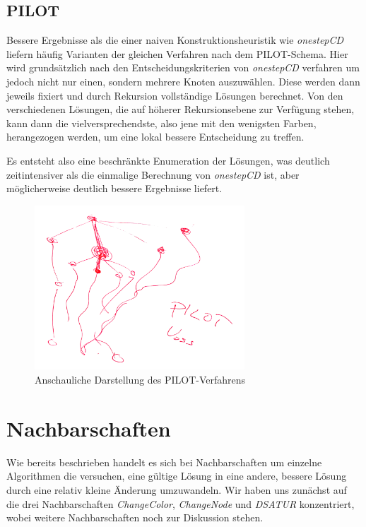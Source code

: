 \subsection{PILOT}

Bessere Ergebnisse als die einer naiven Konstruktionsheuristik wie \textit{onestepCD} liefern häufig Varianten der gleichen Verfahren nach dem PILOT-Schema. Hier  wird grundsätzlich nach den Entscheidungskriterien von \textit{onestepCD} verfahren um jedoch nicht nur einen, sondern mehrere Knoten auszuwählen. Diese werden dann jeweils fixiert und durch Rekursion vollständige Lösungen berechnet. Von den verschiedenen Lösungen, die auf höherer Rekursionsebene zur Verfügung stehen, kann dann die vielversprechendste, also jene mit den wenigsten Farben, herangezogen werden, um eine lokal bessere Entscheidung zu treffen.

Es entsteht also eine beschränkte Enumeration der Lösungen, was deutlich zeitintensiver als die einmalige Berechnung von \textit{onestepCD} ist, aber möglicherweise deutlich bessere Ergebnisse liefert.

\begin{figure}
	\centering
	\includegraphics[width=0.7\textwidth]{../img/pilot}
	\caption{Anschauliche Darstellung des PILOT-Verfahrens}
	\label{fig:pilot}
\end{figure}

\section{Nachbarschaften}
\label{sec:neigh}
Wie bereits beschrieben handelt es sich bei Nachbarschaften um einzelne Algorithmen die versuchen, eine gültige Lösung in eine andere, bessere Lösung durch eine relativ kleine Änderung umzuwandeln. Wir haben uns zunächst auf die drei Nachbarschaften \emph{ChangeColor}, \emph{ChangeNode} und \emph{DSATUR} konzentriert, wobei weitere Nachbarschaften noch zur Diskussion stehen.


